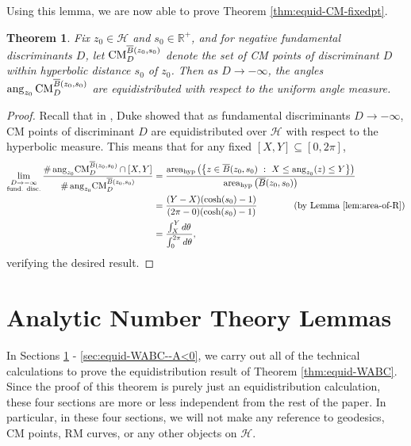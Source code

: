\documentclass[11pt,letterpaper,reqno]{amsart}
\newtheorem{theorem}{Theorem}[section]
\numberwithin{equation}{section}
\numberwithin{figure}{section}
\numberwithin{table}{section}
\newcommand{\lrp}[1]{\left(#1\right)}
\newcommand{\lrcb}[1]{\left\{#1\right\}}
\newcommand{\RR}{\mathbb{R}}
\newcommand{\HH}{\mathcal{H}}
\newcommand{\CM}{\textnormal{CM}}
\begin{document}
Using this lemma, we are now able to prove Theorem \ref{thm:equid-CM-fixedpt}.
{
\renewcommand{\thetheorem}{\ref{thm:equid-CM-fixedpt}}
\begin{theorem} 
    Fix $z_0 \in \HH$ and $s_0 \in \RR^+$, and for negative fundamental discriminants $D$, let 
    $\CM^{\overline B(z_0, s_0)}_{D}$ denote the set of CM points of discriminant $D$
    within hyperbolic distance $s_0$ of $z_0$.
    Then as $D \to -\infty$, the angles $\mathrm{ang}_{z_0}\, \CM^{\overline B(z_0,s_0)}_{D}$ are equidistributed with respect to the uniform angle measure.
\end{theorem}
\addtocounter{theorem}{-1}
}
\begin{proof}
    Recall that in \cite[Theorem 1 (i)]{duke}, Duke showed that as fundamental discriminants $D \to -\infty$, CM points of discriminant $D$ are equidistributed over $\HH$ with respect to the hyperbolic measure. This means that for any fixed $[X,Y] \subseteq [0,2\pi]$,
    \begin{align}
        \lim_{\substack{D \to -\infty \\ \text{fund. disc.}}}
        \frac{
            \#\, \mathrm{ang}_{z_0}\CM^{\overline B(z_0, s_0)}_{D} \cap [X,Y]
        }{
            \#\, \mathrm{ang}_{z_0}\CM^{\overline B(z_0, s_0)}_{D}
        } 
        &= 
        \frac{
            \mathrm{area}_\mathrm{hyp}\lrp{\lrcb{z \in \overline B(z_0,s_0) ~:~ X \le \mathrm{ang}_{z_0}(z) \le Y}}
        }{
            \mathrm{area}_\mathrm{hyp}\lrp{\overline B(z_0,s_0)}
        } \\
        &= 
        \frac{
            (Y-X)(\cosh(s_0)-1)
        }{
            (2\pi-0)(\cosh(s_0)-1)
        } \qquad\qquad \text{(by Lemma \ref{lem:area-of-R})} \\
        &= 
        \frac{
            \int_X^Y d\theta
        }{
            \int_0^{2\pi} d\theta
        },
    \end{align}
    verifying the desired result.
\end{proof}







\section{Analytic Number Theory Lemmas} 
\label{sec:equid-WABC--ANT-lemmas}

In Sections \ref{sec:equid-WABC--ANT-lemmas} - \ref{sec:equid-WABC--A<0}, we carry out all of the technical calculations to prove the equidistribution result of Theorem \ref{thm:equid-WABC}. 
Since the proof of this theorem is purely just an equidistribution calculation, these four sections are more or less independent from the rest of the paper. In particular, in these four sections, we will not make any reference to geodesics, CM points, RM curves, or any other objects on $\HH$.
\end{document}
